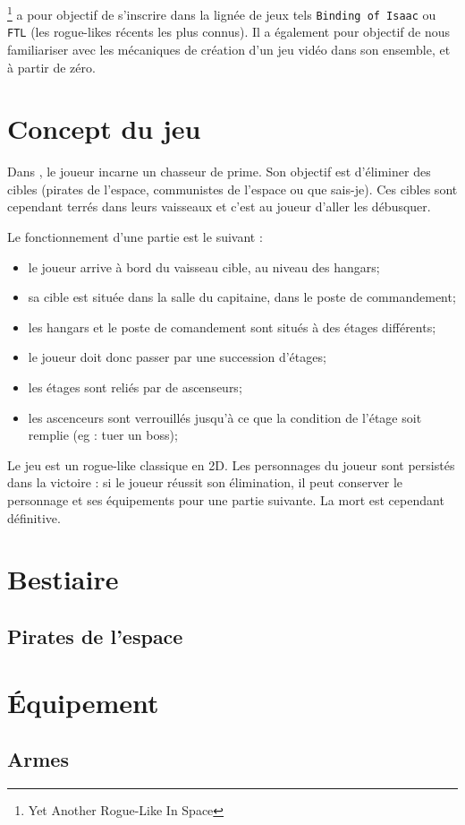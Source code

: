 \yarlis\footnote{Yet Another Rogue-Like In Space} a pour objectif de s'inscrire dans la lignée de jeux tels \verb|Binding of Isaac| ou \verb|FTL| (les rogue-likes récents les plus connus). Il a également pour objectif de nous familiariser avec les mécaniques de création d'un jeu vidéo dans son ensemble, et à partir de zéro.

\section{Concept du jeu}

Dans \yarlis{}, le joueur incarne un chasseur de prime. Son objectif est d'éliminer des cibles (pirates de l'espace, communistes de l'espace ou que sais-je). Ces cibles sont cependant terrés dans leurs vaisseaux et c'est au joueur d'aller les débusquer.

Le fonctionnement d'une partie est le suivant :
\begin{itemize}
\item le joueur arrive à bord du vaisseau cible, au niveau des hangars;
\item sa cible est située dans la salle du capitaine, dans le poste de commandement;
\item les hangars et le poste de comandement sont situés à des étages différents;
\item le joueur doit donc passer par une succession d'étages;
\item les étages sont reliés par de ascenseurs;
\item les ascenceurs sont verrouillés jusqu'à ce que la condition de l'étage soit remplie (eg : tuer un boss);
\end{itemize}

Le jeu est un rogue-like classique en 2D. Les personnages du joueur sont persistés dans la victoire : si le joueur réussit son élimination, il peut conserver le personnage et ses équipements pour une partie suivante. La mort est cependant définitive.

\section{Bestiaire}

\subsection{Pirates de l'espace}


\section{Équipement}

\subsection{Armes}

